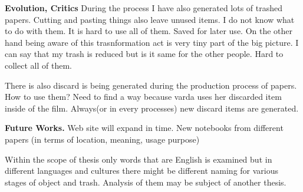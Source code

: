 






%
%
\textbf{Evolution, Critics} During the process I have also generated lots of trashed papers. Cutting and pasting things also leave unused items. I do not know what to do with them. It is hard to use all of them. Saved for later use. On the other hand being aware of this trasnformation act is very tiny part of the big picture. I can say that my trash is reduced but is it same for the other people. Hard to collect all of them. 

There is also discard is being generated during the production process of papers. How to use them? Need to find a way because varda uses her discarded item inside of the film. Always(or in every processes) new discard items are generated.






%
%
\textbf{Future Works.} Web site will expand in time. New notebooks from different papers (in terms of location, meaning, usage purpose)

Within the scope of thesis only words that are English is examined but in different languages and cultures there might be different naming for various stages of object and trash. Analysis of them may be subject of another thesis.




